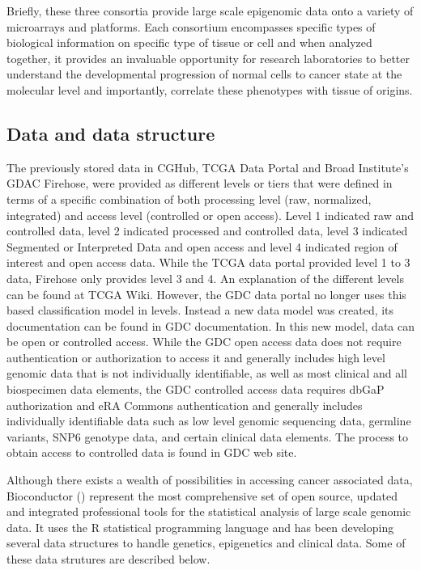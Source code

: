  Briefly, these three consortia provide large scale epigenomic data onto a variety of microarrays and  platforms. Each consortium encompasses specific types of biological information on specific type of tissue or cell and when analyzed together, it provides an invaluable opportunity for research laboratories to better understand the developmental progression of normal cells to cancer state at the molecular level and importantly, correlate these phenotypes with tissue of origins.

\subsection{Data and data structure} \label{susec:structure}

The previously stored data in CGHub, TCGA Data Portal and Broad Institute’s GDAC Firehose, were provided as different levels or tiers that were defined in terms of a specific combination of both processing level (raw, normalized, integrated) and access level (controlled or open access). Level 1 indicated raw and controlled data, level 2 indicated processed and controlled data, level 3 indicated Segmented or Interpreted Data and open access and level 4 indicated region of interest and open access data. While the TCGA data portal provided level 1 to 3 data, Firehose only provides level 3 and 4. An explanation of the different levels can be found at TCGA Wiki. However, the GDC data portal no longer uses this based classification model in levels. Instead a new data model was created, its documentation can be found in GDC documentation. In this new model, data can be open or controlled access. While the GDC open access data does not require authentication or authorization to access it and generally includes high level genomic data that is not individually identifiable, as well as most clinical and all biospecimen data elements, the GDC controlled access data requires dbGaP authorization and eRA Commons authentication and generally includes individually identifiable data such as low level genomic sequencing data, germline variants, SNP6 genotype data, and certain clinical data elements. The process to obtain access to controlled data is found in GDC web site.


Although there exists a wealth of possibilities \cite{kannan2015public}
in accessing cancer associated data, Bioconductor ()
represent the most comprehensive set of open source,
updated and integrated professional tools for the statistical analysis of large scale genomic data.
It uses the R statistical programming language and has been developing several
data structures to handle genetics, epigenetics and clinical data.
Some of these data strutures are described below.


